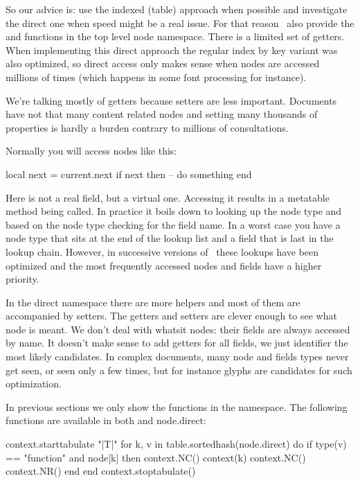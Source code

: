 So our advice is: use the indexed (table) approach when possible and investigate
the direct one when speed might be a real issue. For that reason \LUATEX\ also
provide the  and  functions in the top level node
namespace. There is a limited set of getters. When implementing this direct
approach the regular index by key variant was also optimized, so direct access
only makes sense when nodes are accessed millions of times (which happens in some
font processing for instance).

We're talking mostly of getters because setters are less important. Documents
have not that many content related nodes and setting many thousands of properties
is hardly a burden contrary to millions of consultations.

Normally you will access nodes like this:

\starttyping
local next = current.next
if next then
    -- do something
end
\stoptyping

Here  is not a real field, but a virtual one. Accessing it results in
a metatable method being called. In practice it boils down to looking up the node
type and based on the node type checking for the field name. In a worst case you
have a node type that sits at the end of the lookup list and a field that is last
in the lookup chain. However, in successive versions of \LUATEX\ these lookups
have been optimized and the most frequently accessed nodes and fields have a
higher priority.

In the direct namespace there are more helpers and most of them are accompanied
by setters. The getters and setters are clever enough to see what node is meant.
We don't deal with whatsit nodes: their fields are always accessed by name. It
doesn't make sense to add getters for all fields, we just identifier the most
likely candidates. In complex documents, many node and fields types never get
seen, or seen only a few times, but for instance glyphs are candidates for such
optimization.

In previous sections we only show the functions in the 
namespace. The following functions are available in both  and \type
{node.direct}:

\startthreerows
\startluacode
    context.starttabulate { "|T|" }
    for k, v in table.sortedhash(node.direct) do
        if type(v) == "function" and node[k] then
            context.NC() context(k)
            context.NC() context.NR()
        end
    end
    context.stoptabulate()
\stopluacode
\stopthreerows

